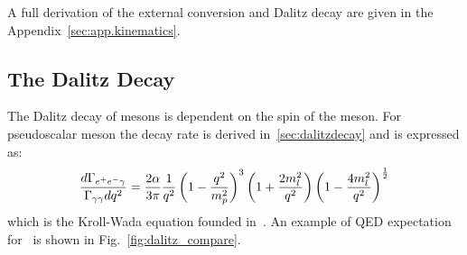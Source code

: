  A full derivation of the external conversion and Dalitz decay are given in the Appendix~\ref{sec:app.kinematics}.
 \FloatBarrier
  \subsection{The Dalitz Decay}
  The Dalitz decay of mesons is dependent on the spin of the meson. For pseudoscalar meson the decay rate is derived in~\ref{sec:dalitzdecay} and is expressed as:
  \begin{align}\label{eq:eegff.finalkroll_II}
  \frac{d\Gamma_{e^+e^- \gamma}}{\Gamma_{\gamma\gamma} dq^2} = \frac{2 \alpha}{3 \pi} \frac{1}{q^2} \left( 1- \frac{q^2}{m_p^2}\right)^3 \left( 1+ \frac{2m_l^2}{q^2}\right) \left( 1- \frac{4m_l^2}{q^2}\right)^{\frac{1}{2}} 
  \end{align}
  which is the Kroll-Wada equation founded in~\cite{KrollWada,landsberg}.
   An example of QED expectation for \etaTP  \ is shown in Fig.~\ref{fig:dalitz_compare}.
